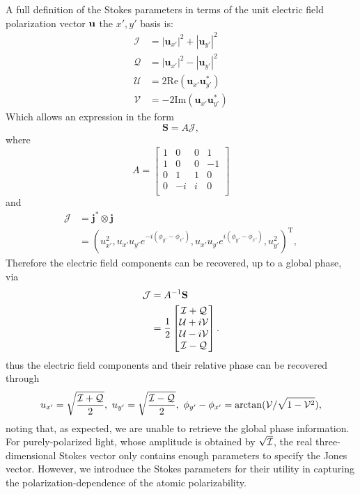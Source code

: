 	A full definition of the Stokes parameters in terms of the unit electric field polarization vector $\mathbf{u}$ the $x',y'$ basis is:
	\begin{align}
	    \mathcal{I} &= |\mathbf{u}_{x'}|^2 + |\mathbf{u}_{y'}|^2 \\ 
	    \mathcal{Q} &= |\mathbf{u}_{x'}|^2 - |\mathbf{u}_{y'}|^2 \\
	    \mathcal{U} &= 2 \text{Re} \left(\mathbf{u}_{x'} \mathbf{u}_{y'}^*\right) \\
	    \mathcal{V} &= -2 \text{Im}\left(\mathbf{u}_{x'} \mathbf{u}_{y'}^*\right)
	\end{align}
	Which allows an expression in the form
	\begin{equation}
		\mathbf{S} = A \mathcal{J},
	\end{equation}
	where
	\begin{equation}
		A=\begin{bmatrix}
		 1 & 0 & 0 & 1 \\
		 1 & 0 & 0 & -1 \\
		 0 & 1 & 1 & 0 \\
		 0 & -i & i & 0 \\
		\end{bmatrix}
	\end{equation}
	and 
	\begin{align}
		\mathcal{J} &= \mathbf{j}^*\otimes\mathbf{j}\\
					&= (u_{x'}^2,u_{x'}u_{y'}e^{-i(\phi_{y'}-\phi_{x'})},u_{x'}u_{y'}e^{i(\phi_{y'}-\phi_{x'})},u_{y'}^2)^\mathrm{T},
	\end{align}
	Therefore the electric field components can be recovered, up to a global phase, via
	\begin{align}
		 \mathcal{J} &= A^{-1} \mathbf{S}\\
					 &= \frac{1}{2}\begin{bmatrix} 
					 				\mathcal{I}+\mathcal{Q}\\\mathcal{U}+i\mathcal{V}\\\mathcal{U}-i\mathcal{V}\\\mathcal{I}-\mathcal{Q}
								 	\end{bmatrix}.
	\end{align}
	thus the electric field components and their relative phase can be recovered through
	\begin{equation}
		 u_{x'} = \sqrt{\frac{\mathcal{I}+\mathcal{Q}}{2}},~u_{y'} = \sqrt{\frac{\mathcal{I}-\mathcal{Q}}{2}},~\phi_{y'}-\phi_{x'} = \mathrm{arctan}(\mathcal{V}/\sqrt{1-\mathcal{V}^2}),
	\end{equation}
	noting that, as expected, we are unable to retrieve the global phase information. For purely-polarized light, whose amplitude is obtained by $\sqrt{\mathcal{I}}$, the real three-dimensional Stokes vector only contains enough parameters to specify the Jones vector. 
	However, we introduce the Stokes parameters for their utility in capturing the polarization-dependence of the atomic polarizability.


